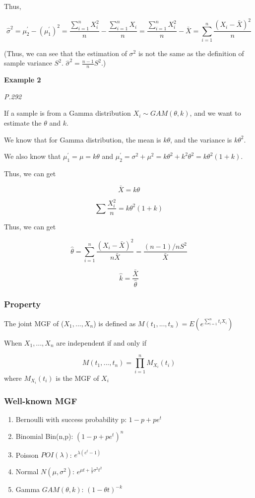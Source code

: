 \documentclass[
]{book}
\begin{document}
Thus,

\[\hat{\sigma}^2=\mu_2^{'}-(\mu^{'}_1)^2=\frac{\sum_{i=1}^n X_i^2}{n}-\frac{\sum_{i=1}^n X_i}{n}=\frac{\sum_{i=1}^n X_i^2}{n}-\bar{X}=\sum_{i=1}^n \frac{(X_i-\bar{X})^2}{n}\]

(Thus, we can see that the estimation of \(\sigma^2\) is not the same as the definition of sample variance \(S^2\). \(\hat{\sigma}^2=\frac{n-1}{n}S^2\).)

\textbf{Example 2}

\emph{P.292}

If a sample is from a Gamma distribution \(X_i \sim GAM(\theta,k)\), and we want to estimate the \(\theta\) and \(k\).

We know that for Gamma distribution, the mean is \(k\theta\), and the variance is \(k\theta^2\).

We also know that \(\mu_1^{'}=\mu=k\theta\) and \(\mu_2^{'}= \sigma^2+\mu^2= k\theta^2+k^2\theta^2=k\theta^2(1+k)\).

Thus, we can get

\[\bar{X}=k\theta\]

\[\sum \frac{X_i^2}{n}=k\theta^2(1+k)\]

Thus, we can get

\[\hat{\theta}=\sum_{i=1}^n \frac{(X_i-\bar{X})^2}{n \bar{X}}=\frac{(n-1)/n S^2}{\bar{X}}\]

\[\hat{k}=\frac{\bar{X}}{\hat{\theta}}\]

\hypertarget{property}{%
\subsubsection{Property}\label{property}}

The joint MGF of (\(X_1, ..., X_n\)) is defined as \(M(t_1,...,t_n)=E(e^{\sum_{i=1}^nt_iX_i})\)

When \(X_1, ..., X_n\) are independent if and only if

\[M(t_1,...,t_n)=\prod_{i=1}^n M_{X_i}(t_i)\]
where \(M_{X_i}(t_i)\) is the MGF of \(X_i\)

\hypertarget{well-known-mgf}{%
\subsubsection{Well-known MGF}\label{well-known-mgf}}

\begin{enumerate}
\def\labelenumi{(\arabic{enumi})}
\item
  Bernoulli with success probability p: \(1-p+pe^t\)
\item
  Binomial Bin(n,p): \((1-p+pe^t)^n\)
\item
  Poisson \(POI(\lambda)\): \(e^{\lambda(e^t-1)}\)
\item
  Normal \(N(\mu,\sigma^2)\): \(e^{\mu t+\frac{1}{2}\sigma^2t^2}\)
\item
  Gamma \(GAM(\theta,k)\): \((1-\theta t)^{-k}\)
\end{enumerate}
\end{document}
